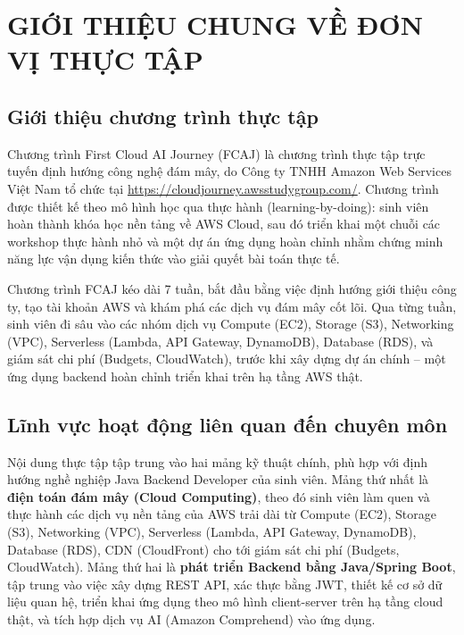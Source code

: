 \documentclass[13pt]{extarticle}
\begin{document}
\section{GIỚI THIỆU CHUNG VỀ ĐƠN VỊ THỰC TẬP}

\subsection{Giới thiệu chương trình thực tập}

Chương trình First Cloud AI Journey (FCAJ) là chương trình thực tập trực tuyến
định hướng công nghệ đám mây, do Công ty TNHH Amazon Web Services Việt Nam tổ chức
tại \url{https://cloudjourney.awsstudygroup.com/}. Chương trình được thiết kế theo mô
hình học qua thực hành (learning-by-doing): sinh viên hoàn thành khóa học nền tảng
về AWS Cloud, sau đó triển khai một chuỗi các workshop thực hành nhỏ và một dự án
ứng dụng hoàn chỉnh nhằm chứng minh năng lực vận dụng kiến thức vào giải quyết bài
toán thực tế.

Chương trình FCAJ kéo dài 7 tuần, bắt đầu bằng việc định hướng giới thiệu công ty,
tạo tài khoản AWS và khám phá các dịch vụ đám mây cốt lõi. Qua từng tuần, sinh viên
đi sâu vào các nhóm dịch vụ Compute (EC2), Storage (S3), Networking (VPC), Serverless
(Lambda, API Gateway, DynamoDB), Database (RDS), và giám sát chi phí (Budgets,
CloudWatch), trước khi xây dựng dự án chính -- một ứng dụng backend hoàn chỉnh
triển khai trên hạ tầng AWS thật.

\subsection{Lĩnh vực hoạt động liên quan đến chuyên môn}

Nội dung thực tập tập trung vào hai mảng kỹ thuật chính, phù hợp với định
hướng nghề nghiệp Java Backend Developer của sinh viên. Mảng thứ nhất là
\textbf{điện toán đám mây (Cloud Computing)}, theo đó sinh viên làm quen và
thực hành các dịch vụ nền tảng của AWS trải dài từ Compute (EC2), Storage
(S3), Networking (VPC), Serverless (Lambda, API Gateway, DynamoDB), Database
(RDS), CDN (CloudFront) cho tới giám sát chi phí (Budgets, CloudWatch). Mảng
thứ hai là \textbf{phát triển Backend bằng Java/Spring Boot}, tập trung vào
việc xây dựng REST API, xác thực bằng JWT, thiết kế cơ sở dữ liệu quan hệ,
triển khai ứng dụng theo mô hình client-server trên hạ tầng cloud thật, và
tích hợp dịch vụ AI (Amazon Comprehend) vào ứng dụng.
\end{document}
